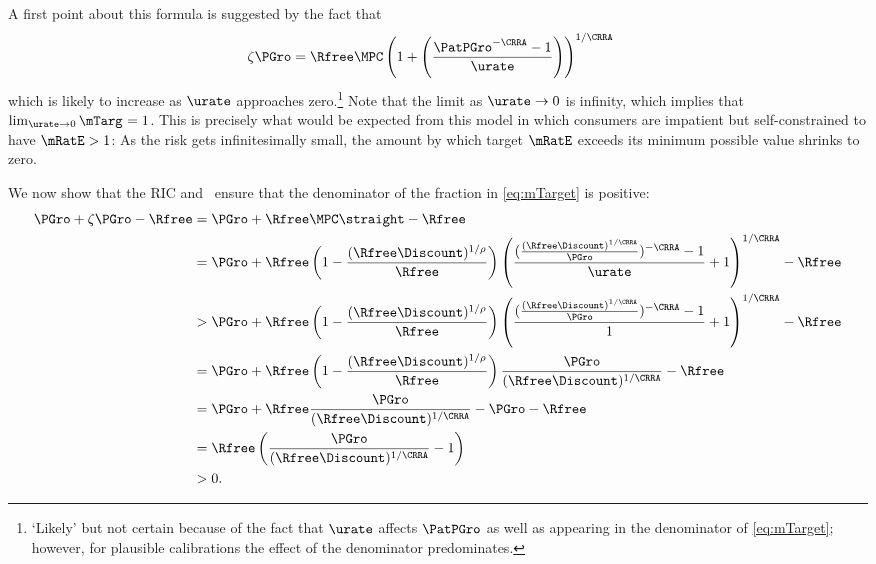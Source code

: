 \documentclass{\handout}
\begin{document}
A first point about this formula is suggested by the fact that
\begin{equation}\begin{gathered}\begin{aligned}
  \zeta\PGro & =  \Rfree \MPCU \left(1+\left(\frac{\PatPGro^{-\CRRA} - 1}{\urate}\right)\right)^{1/\CRRA}
\end{aligned}\end{gathered}\end{equation}
which is likely to increase as $\urate$ approaches zero.\footnote{`Likely' but not certain because of the fact that $\urate$ affects $\PatPGro$ as well as
  appearing in the denominator of \eqref{eq:mTarget}; however, for
  plausible calibrations the effect of the denominator predominates.}
Note that the limit as $\urate \rightarrow 0$ is infinity, which
implies that $\lim_{\urate \rightarrow
  0} \mTarg^{\hideSup} = 1$.  This is precisely what would be expected from
this model in which consumers are impatient but self-constrained to
have $\mRatE > 1$:  As the risk gets infinitesimally small, the
amount by which target $\mRatE$ exceeds its minimum possible value shrinks to
zero.

We now show that the RIC and \GICPGro~ensure that the denominator of the fraction in \eqref{eq:mTarget} is positive: 
\begin{equation*}\begin{gathered}\begin{aligned}
\PGro + \zeta \PGro - \Rfree & =  \PGro + \Rfree \MPCU \straight - \Rfree
 \\& =  \PGro + \Rfree \left(1- \frac{(\Rfree \Discount)^{1/\rho}}{\Rfree}\right) \left(\frac{(\frac{(\Rfree\Discount)^{1/\CRRA}}{\PGro})^{-\CRRA}-1}{\urate}+1\right)^{1/\CRRA}-\Rfree
 \\& >   \PGro+\Rfree \left(1-\frac{(\Rfree\Discount)^{1/\rho}}{\Rfree}\right)
\left(\frac{(\frac{(\Rfree\Discount)^{1/\CRRA}}{\PGro})^{-\CRRA}-1}{1}+1\right)^{1/\CRRA}-\Rfree
 \\& =  \PGro+\Rfree\left(1-\frac{(\Rfree\Discount)^{1/\rho}}{\Rfree}\right)\frac{\PGro}{(\Rfree\Discount)^{1/\CRRA}}-\Rfree
 \\& =  \PGro+\Rfree \frac{\PGro}{(\Rfree\Discount)^{1/\CRRA}}- \PGro - \Rfree
 \\& =  \Rfree \left(\frac{\PGro}{(\Rfree\Discount)^{1/\CRRA}}-1\right)
 \\& >  0.
\end{aligned}\end{gathered}\end{equation*}
\end{document}
